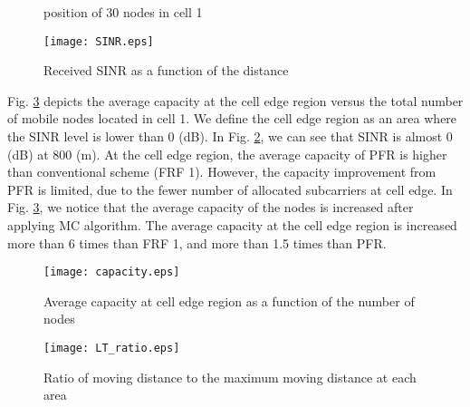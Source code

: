 \documentclass[conference]{IEEEtran}
\begin{document}
\begin{figure}[tbp]
\centering
{}
\label{F:node}
\caption{position of 30 nodes in cell 1}
\end{figure}


\begin{figure}[tbp]
\centering
\texttt{[image: SINR.eps]}
\caption{Received SINR as a function of the distance}
\label{F:SINR}
\end{figure}


Fig. \ref{F:capacity} depicts the average capacity at the cell edge region versus the total number of mobile nodes located in cell 1. We define the cell edge region as an area where the SINR level is lower than 0 (dB). In Fig. \ref{F:SINR}, we can see that SINR is almost 0 (dB) at 800 (m). At the cell edge region, the average capacity of PFR is higher than conventional scheme (FRF 1). However, the capacity improvement from PFR is limited, due to the fewer number of allocated subcarriers at cell edge. In Fig. \ref{F:capacity}, we notice that the average capacity of the nodes is increased after applying MC algorithm. The average capacity at the cell edge region is increased more than 6 times than FRF 1, and more than 1.5 times than PFR.


\begin{figure}[tbp]
\centering
\texttt{[image: capacity.eps]}
\caption{Average capacity at cell edge region as a function of the number of nodes}
\label{F:capacity}
\end{figure}


\begin{figure}[tbp]
\centering
\texttt{[image: LT\_ratio.eps]}
\caption{Ratio of moving distance to the maximum moving distance at each area}
\label{F:LT_ratio}
\end{figure}
\end{document}
